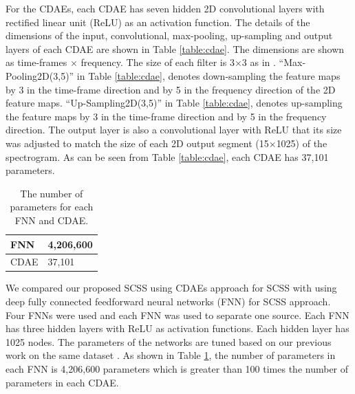 \documentclass{article}
\begin{document}
For the CDAEs, each CDAE has seven hidden 2D convolutional layers with rectified linear unit (ReLU) as an activation function. The details of the dimensions of the input, convolutional, max-pooling, up-sampling and output layers of each CDAE are shown in Table \ref{table:cdae}. The dimensions are shown as time-frames $\times$ frequency. The size of each filter is 3$\times$3 as in \cite{Yanmin:16:vdcnnnrsr,Filip:16:fcdammcr}. ``Max-Pooling2D(3,5)'' in Table \ref{table:cdae}, denotes down-sampling the feature maps by 3 in the time-frame direction and by 5 in the frequency direction of the 2D feature maps. ``Up-Sampling2D(3,5)'' in Table \ref{table:cdae}, denotes up-sampling the feature maps by 3 in the time-frame direction and by 5 in the frequency direction. The output layer is also a convolutional layer with ReLU that its size was adjusted to match the size of each 2D output segment (15$\times$1025) of the spectrogram. As can be seen from Table \ref{table:cdae}, each CDAE has 37,101 parameters. 

\begin{table}[]
\centering
\caption{The number of parameters for each FNN and CDAE.}
\label{table:parmtrs}
\begin{tabular}{ll}
\hline
FNN & 4,206,600  \\
\hline
CDAE & 37,101  \\
\hline
\end{tabular}
\end{table}

We compared our proposed SCSS using CDAEs approach for SCSS with using deep fully connected feedforward neural networks (FNN) for SCSS approach. Four FNNs were used and each FNN was used to separate one source. Each FNN has three hidden layers with ReLU as activation functions. Each hidden layer has 1025 nodes. The parameters of the networks are tuned based on our previous work on the same dataset \cite{Emad:16:scassdnne, grais:16:cmescassdnn}. As shown in Table \ref{table:parmtrs}, the number of parameters in each FNN is 4,206,600 parameters which is greater than 100 times the number of parameters in each CDAE.
\end{document}
